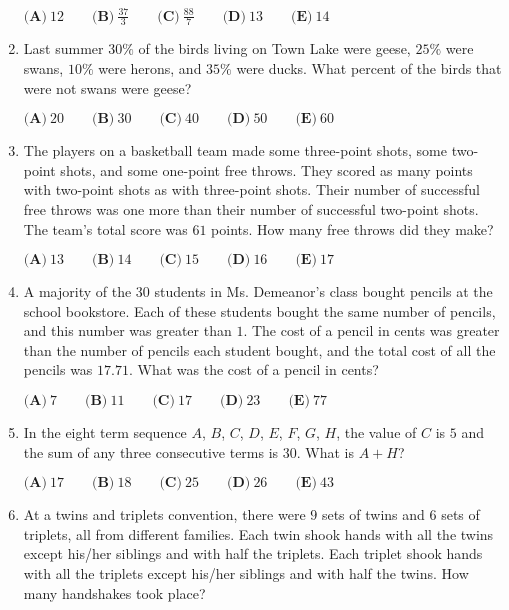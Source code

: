 \documentclass{article}
\begin{document}
\begin{enumerate}[label=\arabic*., itemsep=0.5em]
$
\textbf{(A)}\ 12 \qquad
\textbf{(B)}\ \frac{37}{3} \qquad
\textbf{(C)}\ \frac{88}{7} \qquad
\textbf{(D)}\ 13 \qquad
\textbf{(E)}\ 14 $\par \vspace{0.5em}\item Last summer $30\%$ of the birds living on Town Lake were geese, $25\%$ were swans, $10\%$ were herons, and $35\%$ were ducks. What percent of the birds that were not swans were geese?
 
$
\textbf{(A)}\ 20 \qquad
\textbf{(B)}\ 30 \qquad
\textbf{(C)}\ 40 \qquad
\textbf{(D)}\ 50 \qquad
\textbf{(E)}\ 60$\par \vspace{0.5em}\item The players on a basketball team made some three-point shots, some two-point shots, and some one-point free throws. They scored as many points with two-point shots as with three-point shots. Their number of successful free throws was one more than their number of successful two-point shots. The team's total score was $61$ points. How many free throws did they make?
 
$
\textbf{(A)}\ 13 \qquad
\textbf{(B)}\ 14 \qquad
\textbf{(C)}\ 15 \qquad
\textbf{(D)}\ 16 \qquad
\textbf{(E)}\ 17 $\par \vspace{0.5em}\item A majority of the $30$ students in Ms. Demeanor's class bought pencils at the school bookstore. Each of these students bought the same number of pencils, and this number was greater than $1$. The cost of a pencil in cents was greater than the number of pencils each student bought, and the total cost of all the pencils was $17.71$. What was the cost of a pencil in cents?

$
\textbf{(A)}\ 7 \qquad
\textbf{(B)}\ 11 \qquad
\textbf{(C)}\ 17 \qquad
\textbf{(D)}\ 23 \qquad
\textbf{(E)}\ 77 $\par \vspace{0.5em}\item In the eight term sequence $A$, $B$, $C$, $D$, $E$, $F$, $G$, $H$, the value of $C$ is $5$ and the sum of any three consecutive terms is $30$. What is $A+H$?

$
\textbf{(A)}\ 17 \qquad
\textbf{(B)}\ 18 \qquad
\textbf{(C)}\ 25 \qquad
\textbf{(D)}\ 26 \qquad
\textbf{(E)}\ 43 $\par \vspace{0.5em}\item At a twins and triplets convention, there were $9$ sets of twins and $6$ sets of triplets, all from different families. Each twin shook hands with all the twins except his/her siblings and with half the triplets. Each triplet shook hands with all the triplets except his/her siblings and with half the twins. How many handshakes took place?


\end{enumerate}
\end{document}
